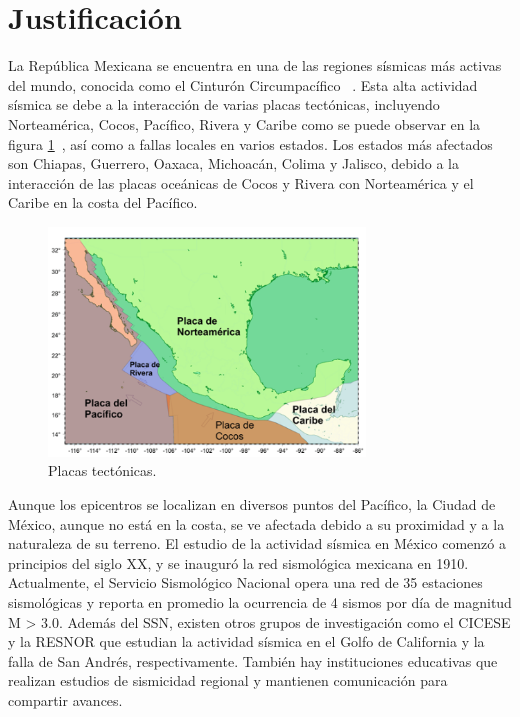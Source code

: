 \section{Justificación}
La República Mexicana se encuentra en una de las regiones sísmicas más activas del mundo, conocida como el Cinturón Circumpacífico ~\cite{SGM2023}. Esta alta actividad sísmica se debe a la interacción de varias placas tectónicas, incluyendo Norteamérica, Cocos, Pacífico, Rivera y Caribe como se puede observar en la figura \ref{fig:Mapa de placas tectonicas}~\cite{SGM}, así como a fallas locales en varios estados. Los estados más afectados son Chiapas, Guerrero, Oaxaca, Michoacán, Colima y Jalisco, debido a la interacción de las placas oceánicas de Cocos y Rivera con Norteamérica y el Caribe en la costa del Pacífico. 
\begin{figure}[H]
    \centering
    \includegraphics[width=0.75\textwidth]{img/placas.png}
    \caption{Placas tectónicas.}
    \label{fig:Mapa de placas tectonicas}
\end{figure}

 
Aunque los epicentros se localizan en diversos puntos del Pacífico, la Ciudad de México, aunque no está en la costa, se ve afectada debido a su proximidad y a la naturaleza de su terreno. El estudio de la actividad sísmica en México comenzó a principios del siglo XX, y se inauguró la red sismológica mexicana en 1910. Actualmente, el Servicio Sismológico Nacional \cite{SSN} opera una red de 35 estaciones sismológicas y reporta en promedio la ocurrencia de 4 sismos por día de magnitud M > 3.0. Además del SSN, existen otros grupos de investigación como el CICESE y la RESNOR que estudian la actividad sísmica en el Golfo de California y la falla de San Andrés, respectivamente. También hay instituciones educativas que realizan estudios de sismicidad regional y mantienen comunicación para compartir avances\cite{SGM2023}.

